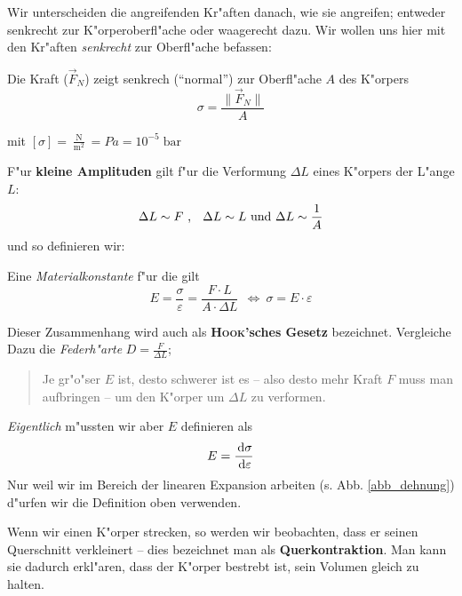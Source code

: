 Wir unterscheiden die angreifenden Kr"aften danach, wie sie angreifen;
entweder senkrecht zur K"orperoberfl"ache
oder waagerecht dazu. Wir wollen uns hier mit den Kr"aften
\emph{senkrecht} zur Oberfl"ache befassen:
\begin{Def}
    Die Kraft ($\vec F_N$)
   zeigt senkrech ("`normal"') zur Oberfl"ache $A$ des K"orpers
\begin{equation}
   \label{eqn_Def_zugspannung}
   \sigma = \frac{\|\vec F_N\|}{A}
\end{equation}
\end{Def}
mit $[\sigma] = \frac{\operatorname{N}}{\operatorname{m^2}} = Pa =
10^{-5} \operatorname{bar}$


\bigskip

F"ur \textbf{kleine Amplituden} gilt f"ur die Verformung $\Delta L$ eines
K"orpers der L"ange $L$: 
$$
\Delta L \sim F \text{ , \;  } \Delta L \sim L \text{ und } \Delta L \sim \frac{1}{A}
$$
und so definieren wir:
\begin{Def}
Eine \emph{Materialkonstante} f"ur die gilt
\begin{equation}
   \label{eqn_der_elastizitaetsmodul}
   E = \frac{\sigma}{\varepsilon} = \frac{F \cdot  L}{A \cdot \Delta
     L} ~ ~ \Leftrightarrow ~ \boxed{ \sigma = E \cdot \varepsilon }
\end{equation}
\end{Def}
Dieser Zusammenhang wird auch als \textbf{\textsc{Hook}'sches Gesetz}
bezeichnet. Vergleiche Dazu die \emph{Federh"arte} $D = \frac{F}{\Delta
L}$; 

\begin{quote}
   Je gr"o"ser $E$ ist, desto schwerer ist es -- also desto mehr Kraft
   $F$ muss man aufbringen -- um den K"orper um $\Delta L$ zu
   verformen.
\end{quote}


\emph{Eigentlich} m"ussten wir aber $E$ definieren als 
\begin{equation}
   \label{eq:55}
   E = \frac{\, \mathrm{d} \sigma}{\, \mathrm{d} \varepsilon}
\end{equation}
Nur weil wir im Bereich der linearen Expansion arbeiten
(s. Abb. \ref{abb_dehnung}) d"urfen wir die Definition oben verwenden.

\bigskip

\noindent
Wenn wir einen K"orper strecken, so werden wir beobachten, dass er
seinen Querschnitt verkleinert -- dies bezeichnet man als
\textbf{Querkontraktion}. Man kann sie dadurch
erkl"aren, dass der K"orper bestrebt ist, sein Volumen gleich zu
halten.

